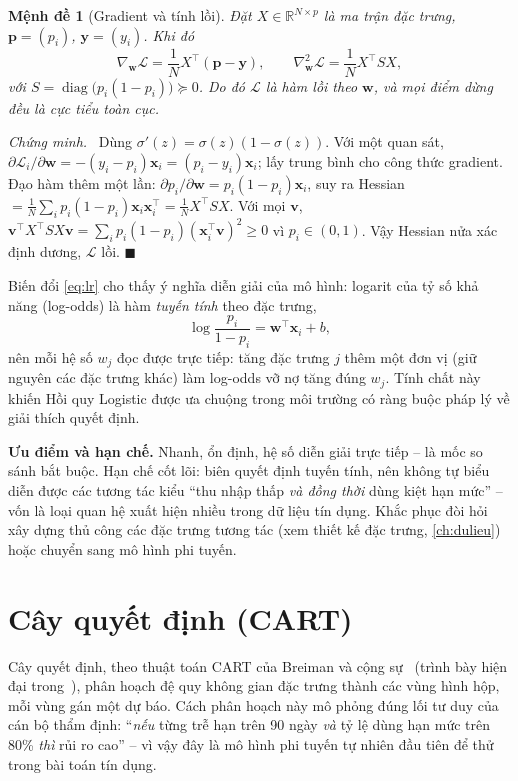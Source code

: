 \documentclass[12pt,a4paper,oneside]{report}
\theoremstyle{vnplain}
\newtheorem{menhde}[dlytheo]{Mệnh đề}
\theoremstyle{vndef}
\renewcommand{\proofname}{Chứng minh}
\renewenvironment{proof}[1][\proofname]{\par\noindent\textit{#1.}\ }{\hfill$\blacksquare$\par\vspace{4pt}}
\newcommand{\R}{\mathbb{R}}
\newcommand{\xv}{\mathbf{x}}
\newcommand{\wv}{\mathbf{w}}
\begin{document}
\begin{menhde}[Gradient và tính lồi]\label{md:lr}
Đặt $X\in\R^{N\times p}$ là ma trận đặc trưng, $\mathbf{p}=(p_i)$, $\mathbf{y}=(y_i)$. Khi đó
\[
  \nabla_{\wv}\mathcal{L}=\frac{1}{N}X^\top(\mathbf{p}-\mathbf{y}),
  \qquad
  \nabla^2_{\wv}\mathcal{L}=\frac{1}{N}X^\top S X,
\]
với $S=\operatorname{diag}\big(p_i(1-p_i)\big)\succeq 0$. Do đó $\mathcal{L}$ là hàm lồi
theo $\wv$, và mọi điểm dừng đều là cực tiểu toàn cục.
\end{menhde}
\begin{proof}
Dùng $\sigma'(z)=\sigma(z)(1-\sigma(z))$. Với một quan sát, $\partial\mathcal{L}_i/\partial
\wv=-(y_i-p_i)\xv_i=(p_i-y_i)\xv_i$; lấy trung bình cho công thức gradient. Đạo hàm thêm
một lần: $\partial p_i/\partial\wv=p_i(1-p_i)\xv_i$, suy ra Hessian $=\frac1N\sum_i
p_i(1-p_i)\xv_i\xv_i^\top=\frac1N X^\top S X$. Với mọi $\mathbf{v}$,
$\mathbf{v}^\top X^\top S X\mathbf{v}=\sum_i p_i(1-p_i)(\xv_i^\top\mathbf{v})^2\ge 0$ vì
$p_i\in(0,1)$. Vậy Hessian nửa xác định dương, $\mathcal{L}$ lồi.
\end{proof}

Biến đổi \cref{eq:lr} cho thấy ý nghĩa diễn giải của mô hình: logarit của tỷ số khả năng
(log-odds) là hàm \emph{tuyến tính} theo đặc trưng,
\[
  \log\frac{p_i}{1-p_i}=\wv^\top\xv_i+b,
\]
nên mỗi hệ số $w_j$ đọc được trực tiếp: tăng đặc trưng $j$ thêm một đơn vị (giữ nguyên các
đặc trưng khác) làm log-odds vỡ nợ tăng đúng $w_j$. Tính chất này khiến Hồi quy Logistic
được ưa chuộng trong môi trường có ràng buộc pháp lý về giải thích quyết định.

\noindent\textbf{Ưu điểm và hạn chế.} Nhanh, ổn định, hệ số diễn giải trực tiếp -- là
mốc so sánh bắt buộc. Hạn chế cốt lõi: biên quyết định tuyến tính, nên không tự biểu diễn
được các tương tác kiểu ``thu nhập thấp \emph{và đồng thời} dùng kiệt hạn mức'' -- vốn là loại
quan hệ xuất hiện nhiều trong dữ liệu tín dụng. Khắc phục đòi hỏi xây dựng thủ công các đặc trưng tương tác
(xem thiết kế đặc trưng, \cref{ch:dulieu}) hoặc chuyển sang mô hình phi tuyến.

\section{Cây quyết định (CART)}\label{sec:dt}
Cây quyết định, theo thuật toán CART của Breiman và cộng sự~\cite{breiman1984} (trình bày
hiện đại trong~\cite[Ch.~9.2]{hastie2009}), phân hoạch đệ quy không gian đặc trưng thành
các vùng hình hộp, mỗi vùng gán một dự báo. Cách phân hoạch này mô phỏng đúng lối tư duy
của cán bộ thẩm định: ``\emph{nếu} từng trễ hạn trên 90 ngày \emph{và} tỷ lệ dùng hạn mức
trên 80\% \emph{thì} rủi ro cao'' -- vì vậy đây là mô hình phi tuyến tự nhiên đầu tiên để
thử trong bài toán tín dụng.
\end{document}
